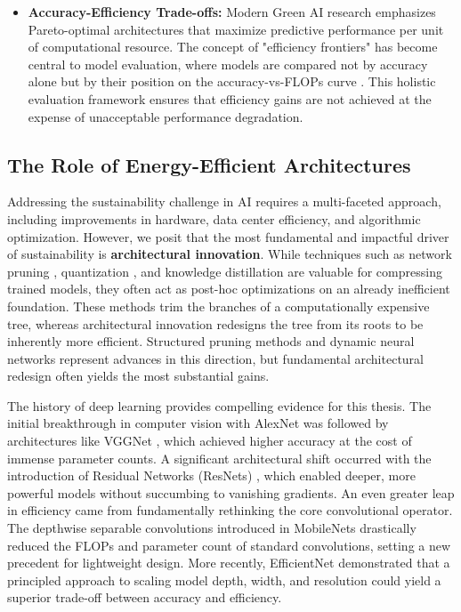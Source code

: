 \documentclass[12pt, a4paper]{article}
\begin{document}
\begin{itemize}
    \item \textbf{Accuracy-Efficiency Trade-offs:} Modern Green AI research emphasizes Pareto-optimal architectures that maximize predictive performance per unit of computational resource. The concept of "efficiency frontiers" has become central to model evaluation, where models are compared not by accuracy alone but by their position on the accuracy-vs-FLOPs curve \cite{dehghani2021efficiency}. This holistic evaluation framework ensures that efficiency gains are not achieved at the expense of unacceptable performance degradation.
\end{itemize}



\subsection{The Role of Energy-Efficient Architectures}
\label{ssec:role_of_architectures}

Addressing the sustainability challenge in AI requires a multi-faceted approach, including improvements in hardware, data center efficiency, and algorithmic optimization. However, we posit that the most fundamental and impactful driver of sustainability is \textbf{architectural innovation}. While techniques such as network pruning \cite{han2015deep}, quantization \cite{gholami2022survey}, and knowledge distillation \cite{hinton2015distilling} are valuable for compressing trained models, they often act as post-hoc optimizations on an already inefficient foundation. These methods trim the branches of a computationally expensive tree, whereas architectural innovation redesigns the tree from its roots to be inherently more efficient. Structured pruning methods \cite{liu2017learning} and dynamic neural networks \cite{han2021dynamic} represent advances in this direction, but fundamental architectural redesign often yields the most substantial gains.

The history of deep learning provides compelling evidence for this thesis. The initial breakthrough in computer vision with AlexNet \cite{krizhevsky2012imagenet} was followed by architectures like VGGNet \cite{simonyan2014very}, which achieved higher accuracy at the cost of immense parameter counts. A significant architectural shift occurred with the introduction of Residual Networks (ResNets) \cite{he2016deep}, which enabled deeper, more powerful models without succumbing to vanishing gradients. An even greater leap in efficiency came from fundamentally rethinking the core convolutional operator. The depthwise separable convolutions introduced in MobileNets \cite{howard2017mobilenets} drastically reduced the FLOPs and parameter count of standard convolutions, setting a new precedent for lightweight design. More recently, EfficientNet \cite{tan2019efficientnet} demonstrated that a principled approach to scaling model depth, width, and resolution could yield a superior trade-off between accuracy and efficiency.
\end{document}
